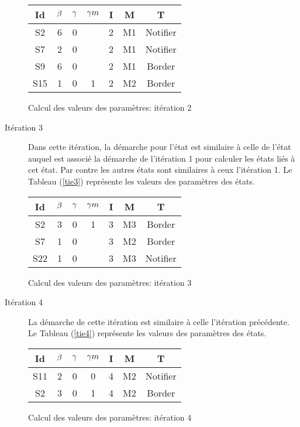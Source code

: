 \begin{Exemple}
\begin{description}
\begin{tableth}
\begin{tabular}{|*{7}{c|}}
		\hline
		Id&$\beta{}$&	$\gamma{}$	&$\gamma m{}$ &	I&	M&	T\\ \hline
		S2&		6&	0&	&	2&	M1&	Notifier\\ \hline
		S7&		2&	0&	&	2&	M1&	Notifier\\ \hline
		S9&		6&	0&	&	2&	M1&	Border\\ \hline
		S15&	1&	0&	1&	2&	M2&	Border\\ \hline		
	\end{tabular}
	\caption{Calcul des valeurs des paramètres: itération 2}\label{tie2}
\end{tableth}
\item[Itération 3] Dans cette itération, la démarche pour l'état  est similaire à celle de l'état  auquel est associé la démarche de l'itération 1 pour calculer les états liés à cet état. Par contre les autres états sont similaires à ceux l'itération 1. Le Tableau (\ref{tie3}) représente les valeurs des paramètres  des états. 
\begin{tableth}
	\centering
	\begin{tabular}{|*{7}{c|}}
		\hline
		Id&$\beta{}$&	$\gamma{}$	&$\gamma m{}$ &	I&	M&	T\\ \hline
		S2&		3&	0&	1&	3&	M3&	Border\\ \hline
		S7&		1&	0&	&	3&	M2&	Border\\ \hline
		S22&	1&	0&	&	3&	M3&	Notifier\\ \hline	
	\end{tabular}
	\caption{Calcul des valeurs des paramètres: itération 3}\label{tie3}
\end{tableth}

\item[Itération 4] La démarche de cette itération est similaire à celle l'itération précédente. Le Tableau (\ref{tie4}) représente les valeurs des paramètres  des états.  
\begin{tableth}
	\centering
	\begin{tabular}{|*{7}{c|}}
		\hline
		Id&$\beta{}$&	$\gamma{}$	&$\gamma m{}$ &	I&	M&	T\\ \hline
		S11&	2&	0&	0&	4&	M2&	Notifier\\ \hline
		S2&		3&	0&	1&	4&	M2&	Border\\ \hline
	\end{tabular}
	\caption{Calcul des valeurs des paramètres: itération 4}\label{tie4}
\end{tableth}


\end{description}
\end{Exemple}

